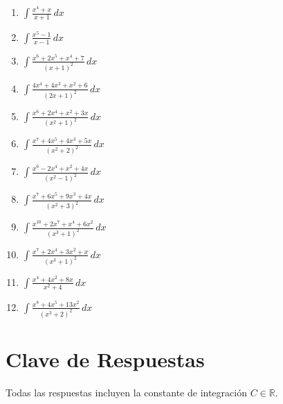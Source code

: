 \documentclass[12pt, letterpaper]{article}
\newcommand{\dx}{\,dx}
\newcommand{\R}{\mathbb{R}}
\begin{document}
\begin{enumerate}[label=\textbf{\arabic*.}, leftmargin=*, itemsep=9pt, start=19]

  \item \dificil\quad $\displaystyle\int \frac{x^{4}+x}{x+1}\dx$

  \item \dificil\quad $\displaystyle\int \frac{x^{5}-1}{x-1}\dx$

  \item \dificil\quad $\displaystyle\int \frac{x^{6}+2x^{5}+x^{4}+7}{(x+1)^{2}}\dx$

  \item \dificil\quad $\displaystyle\int \frac{4x^{4}+4x^{3}+x^{2}+6}{(2x+1)^{2}}\dx$

  \item \muyDificil\quad $\displaystyle\int \frac{x^{6}+2x^{4}+x^{2}+3x}{(x^{2}+1)^{2}}\dx$

  \item \muyDificil\quad $\displaystyle\int \frac{x^{7}+4x^{5}+4x^{3}+5x}{(x^{2}+2)^{2}}\dx$

  \item \muyDificil\quad $\displaystyle\int \frac{x^{6}-2x^{4}+x^{2}+4x}{(x^{2}-1)^{2}}\dx$

  \item \muyDificil\quad $\displaystyle\int \frac{x^{7}+6x^{5}+9x^{3}+4x}{(x^{2}+3)^{2}}\dx$

  \item \muyDificil\quad $\displaystyle\int \frac{x^{10}+2x^{7}+x^{4}+6x^{2}}{(x^{3}+1)^{2}}\dx$

  \item \muyDificil\quad $\displaystyle\int \frac{x^{7}+2x^{4}+3x^{2}+x}{(x^{3}+1)^{2}}\dx$

  \item \muyDificil\quad $\displaystyle\int \frac{x^{4}+4x^{2}+8x}{x^{2}+4}\dx$

  \item \muyDificil\quad $\displaystyle\int \frac{x^{8}+4x^{5}+13x^{2}}{(x^{3}+2)^{2}}\dx$

\end{enumerate}

\newpage
\ifmwclaves
\section{Clave de Respuestas}
Todas las respuestas incluyen la constante de integración $C \in \R$.
\end{document}
